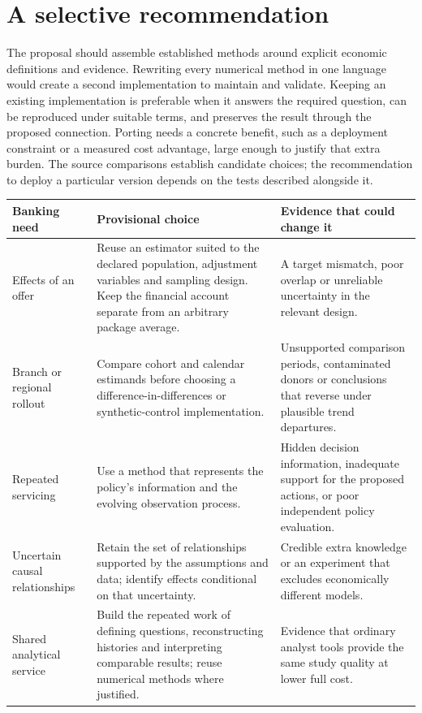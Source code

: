 \section{A selective recommendation}

The proposal should assemble established methods around explicit economic
definitions and evidence. Rewriting every numerical method in one language
would create a second implementation to maintain and validate. Keeping an
existing implementation is preferable when it answers the required question,
can be reproduced under suitable terms, and preserves the result through the
proposed connection. Porting needs a concrete benefit, such as a deployment
constraint or a measured cost advantage, large enough to justify that extra
burden. The source comparisons establish candidate choices; the recommendation
to deploy a particular version depends on the tests described alongside it.
\citep{exec16_s10_design}

\begin{longtable}{P{.23\textwidth}P{.35\textwidth}P{.34\textwidth}}
\toprule
Banking need & Provisional choice & Evidence that could change it\\
\midrule\endhead
Effects of an offer & Reuse an estimator suited to the declared population,
adjustment variables and sampling design. Keep the financial account separate
from an arbitrary package average. & A target mismatch, poor overlap or
unreliable uncertainty in the relevant design.\\
Branch or regional rollout & Compare cohort and calendar estimands before
choosing a difference-in-differences or synthetic-control implementation. &
Unsupported comparison periods, contaminated donors or conclusions that reverse
under plausible trend departures.\\
Repeated servicing & Use a method that represents the policy's information and
the evolving observation process. & Hidden decision information, inadequate
support for the proposed actions, or poor independent policy evaluation.\\
Uncertain causal relationships & Retain the set of relationships supported by
the assumptions and data; identify effects conditional on that uncertainty. &
Credible extra knowledge or an experiment that excludes economically different
models.\\
Shared analytical service & Build the repeated work of defining questions,
reconstructing histories and interpreting comparable results; reuse numerical
methods where justified. & Evidence that ordinary analyst tools provide the
same study quality at lower full cost.\\
\bottomrule
\end{longtable}


